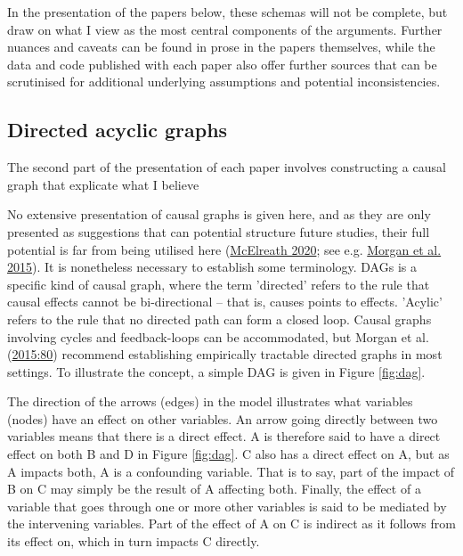 \documentclass[
  a4paper,
  oneside]{uiophdthesis}
\begin{document}
In the presentation of the papers below, these schemas will not be complete, but draw on what I view as the most central components of the arguments. Further nuances and caveats can be found in prose in the papers themselves, while the data and code published with each paper also offer further sources that can be scrutinised for additional underlying assumptions and potential inconsistencies.

\hypertarget{directed-acyclic-graphs}{%
\subsection{Directed acyclic graphs}\label{directed-acyclic-graphs}}

The second part of the presentation of each paper involves constructing a causal graph that explicate what I believe

No extensive presentation of causal graphs is given here, and as they are only presented as suggestions that can potential structure future studies, their full potential is far from being utilised here (\protect\hyperlink{ref-mcelreath2020}{McElreath 2020}; see e.g. \protect\hyperlink{ref-morgan2015}{Morgan et al. 2015}). It is nonetheless necessary to establish some terminology. DAGs is a specific kind of causal graph, where the term 'directed' refers to the rule that causal effects cannot be bi-directional -- that is, causes points to effects. 'Acylic' refers to the rule that no directed path can form a closed loop. Causal graphs involving cycles and feedback-loops can be accommodated, but Morgan et al. (\protect\hyperlink{ref-morgan2015}{2015:80}) recommend establishing empirically tractable directed graphs in most settings. To illustrate the concept, a simple DAG is given in Figure \ref{fig:dag}.

The direction of the arrows (edges) in the model illustrates what variables (nodes) have an effect on other variables. An arrow going directly between two variables means that there is a direct effect. A is therefore said to have a direct effect on both B and D in Figure \ref{fig:dag}. C also has a direct effect on A, but as A impacts both, A is a confounding variable. That is to say, part of the impact of B on C may simply be the result of A affecting both. Finally, the effect of a variable that goes through one or more other variables is said to be mediated by the intervening variables. Part of the effect of A on C is indirect as it follows from its effect on, which in turn impacts C directly.
\end{document}
